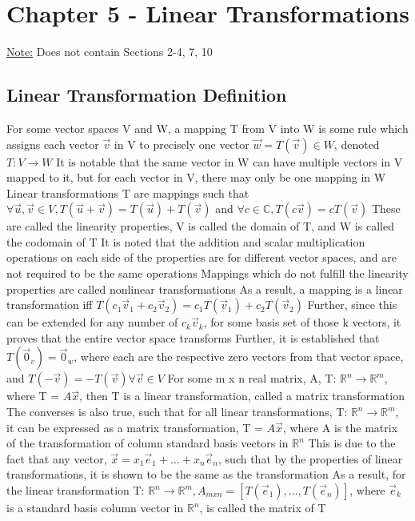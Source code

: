 \documentclass[11 pt, twoside]{article}
\newenvironment{outline*}
{
	\begin{outline}[enumerate]
	}
	{\end{outline}
}
\begin{document}
\section{Chapter 5 - Linear Transformations}
\underline{Note:} Does not contain Sections 2-4, 7, 10
\subsection{Linear Transformation Definition}
\begin{outline*}
\1 For some vector spaces V and W, a mapping T from V into W is some rule which assigns each vector $\vec{v}$ in V to precisely one vector $\vec{w} = T(\vec{v}) \in W$, denoted $T: V \to W$
\2 It is notable that the same vector in W can have multiple vectors in V mapped to it, but for each vector in V, there may only be one mapping in W
\1 Linear transformations T are mappings such that $\forall \vec{u}, \vec{v} \in V, T(\vec{u} + \vec{v}) = T(\vec{u}) + T(\vec{v})$ and $\forall c \in \mathbb{C}, T(c\vec{v}) = cT(\vec{v})$
\2 These are called the linearity properties, V is called the domain of T, and W is called the codomain of T
\2 It is noted that the addition and scalar multiplication operations on each side of the properties are for different vector spaces, and are not required to be the same operations
\2 Mappings which do not fulfill the linearity properties are called nonlinear transformations
\2 As a result, a mapping is a linear transformation iff $T(c_1\vec{v}_1 + c_2\vec{v}_2) = c_1T(\vec{v}_1) + c_2T(\vec{v}_2)$
\3 Further, since this can be extended for any number of $c_k\vec{v}_k$, for some basis set of those k vectors, it proves that the entire vector space transforms
\2 Further, it is established that $T(\vec{0}_v) = \vec{0}_w$, where each are the respective zero vectors from that vector space, and $T(-\vec{v}) = -T(\vec{v}) \forall \vec{v} \in V$
\1 For some m x n real matrix, A, T: $\mathbb{R}^n \to \mathbb{R}^m$, where T = $A\vec{x}$, then T is a linear transformation, called a matrix transformation
\2 The converses is also true, such that for all linear transformations, T: $\mathbb{R}^n \to \mathbb{R}^m$, it can be expressed as a matrix transformation, T = $A\vec{x}$, where A is the matrix of the transformation of column standard basis vectors in $\mathbb{R}^n$
\3 This is due to the fact that any vector, $\vec{x} = x_1\vec{e}_1 + \dots + x_n\vec{e}_n$, such that by the properties of linear transformations, it is shown to be the same as the transformation
\2 As a result, for the linear transformation T: $\mathbb{R}^n \to \mathbb{R}^m, A_{mxn} = [T(\vec{e}_1), \dots, T(\vec{e}_n)]$, where $\vec{e}_k$ is a standard basis column vector in $\mathbb{R}^n$, is called the matrix of T
\end{outline*}
\end{document}
